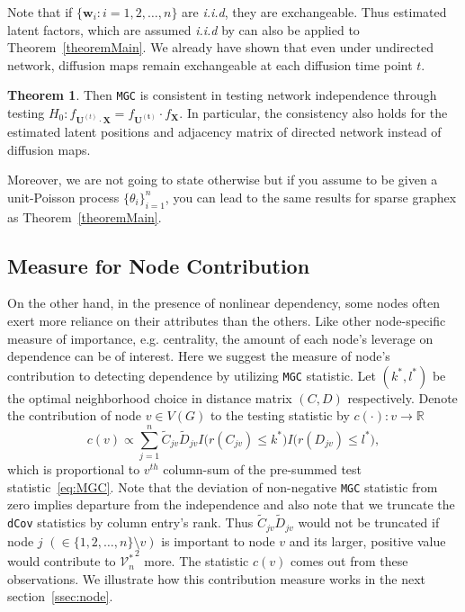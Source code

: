 \documentclass[12pt]{article}
\theoremstyle{definition}
\newtheorem{theorem}{Theorem}[section]
\begin{document}
Note that if $\{ \mathbf{w}_{i} : i = 1,2,\ldots, n \}$ are \textit{i.i.d}, they are exchangeable. Thus estimated latent factors, which are assumed \textit{i.i.d} by \cite{fosdick2015testing} can also be applied to Theorem~\ref{theoremMain}. We already have shown that even under undirected network, diffusion maps remain exchangeable at each diffusion time point $t$. 
\begin{theorem}
	\label{theorem2}
	Then \texttt{MGC} is consistent in testing network independence through testing $H_{0}: f_{\mathbf{U}^{(t)} \cdot \mathbf{X}  }  = f_{\mathbf{U^{(t)}}} \cdot f_{\mathbf{X}}$. In particular, the consistency also holds for the estimated latent positions and adjacency matrix of directed network instead of diffusion maps.
\end{theorem}		
Moreover, we are not going to state otherwise but if you assume to be given a unit-Poisson process $\{ \theta_{i} \}_{i=1}^{n}$, you can lead to the same results for sparse graphex as Theorem~\ref{theoremMain}. 

\subsection{Measure for Node Contribution}

On the other hand, in the presence of nonlinear dependency, some nodes often exert more reliance on their attributes than the others. Like other node-specific measure of importance, e.g. centrality,  the amount of each node's leverage on dependence can be of interest. Here we suggest the measure of node's contribution to detecting dependence by utilizing \texttt{MGC} statistic. Let $(k^{*}, l^{*})$ be the optimal neighborhood choice in distance matrix $(C, D)$ respectively.  Denote the contribution of node $v \in V(G)$ to the testing statistic by  $c(\cdot) : v \rightarrow \mathbb{R}$
\begin{equation}
\label{eq:contribution}
c(v) \propto \sum\limits_{j=1}^{n} \tilde{C}_{j v} \tilde{D}_{j v} I \big(  r (C_{j v}) \leq k^{*}  \big) I \big( r (D_{ j v }) \leq l^{*} \big), 
\end{equation}
which is proportional to $v^{th}$ column-sum of the pre-summed test statistic~\ref{eq:MGC}. Note that the deviation of non-negative \texttt{MGC} statistic from zero implies departure from the independence and also note that we truncate the \texttt{dCov} statistics by column entry's rank. Thus $\tilde{C}_{jv} \tilde{D}_{jv}$ would not be truncated if node $j$ $(\in \{ 1,2, \ldots, n \} \setminus v )$ is important to node $v$ and its larger, positive value would contribute to ${\mathcal{V}^{*}_{n}}^2$ more. The statistic $c(v)$ comes out from these observations. We illustrate how this contribution measure works in the next section~\ref{ssec:node}. 
\end{document}
